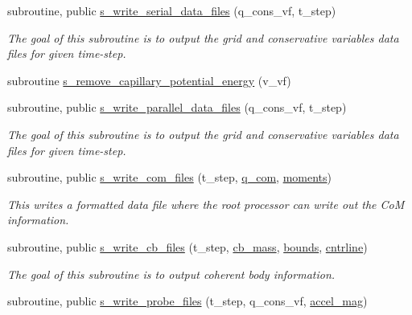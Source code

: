 \begin{DoxyCompactItemize}
subroutine, public \hyperlink{namespacem__data__output_a04c6b0f01b8561e248a740b017fc4f7d}{s\+\_\+write\+\_\+serial\+\_\+data\+\_\+files} (q\+\_\+cons\+\_\+vf, t\+\_\+step)
\begin{DoxyCompactList}\small\item\em The goal of this subroutine is to output the grid and conservative variables data files for given time-\/step. \end{DoxyCompactList}\item 
subroutine \hyperlink{namespacem__data__output_a178b41597f79f2c0a42c0d6e65275b71}{s\+\_\+remove\+\_\+capillary\+\_\+potential\+\_\+energy} (v\+\_\+vf)
\item 
subroutine, public \hyperlink{namespacem__data__output_a9c1271b2c588c1ae3275791d41550f75}{s\+\_\+write\+\_\+parallel\+\_\+data\+\_\+files} (q\+\_\+cons\+\_\+vf, t\+\_\+step)
\begin{DoxyCompactList}\small\item\em The goal of this subroutine is to output the grid and conservative variables data files for given time-\/step. \end{DoxyCompactList}\item 
subroutine, public \hyperlink{namespacem__data__output_a6be3381410dd028014de2c1d02b05139}{s\+\_\+write\+\_\+com\+\_\+files} (t\+\_\+step, \hyperlink{namespacem__data__output_ac5b476661d64159fdcd7364715495f30}{q\+\_\+com}, \hyperlink{namespacem__data__output_abd8505e33c0dce0f0aba7e27ae53bef5}{moments})
\begin{DoxyCompactList}\small\item\em This writes a formatted data file where the root processor can write out the CoM information. \end{DoxyCompactList}\item 
subroutine, public \hyperlink{namespacem__data__output_a40724c992117a24479573d9fbcdfa21b}{s\+\_\+write\+\_\+cb\+\_\+files} (t\+\_\+step, \hyperlink{namespacem__data__output_a775b8128a9261b4d095f9132508d309f}{cb\+\_\+mass}, \hyperlink{namespacem__data__output_a1e7a93a0d32bbc7c691381689771b6f9}{bounds}, \hyperlink{namespacem__data__output_a4f2a6c0ed44fb82d337013e700479ce5}{cntrline})
\begin{DoxyCompactList}\small\item\em The goal of this subroutine is to output coherent body information. \end{DoxyCompactList}\item 
subroutine, public \hyperlink{namespacem__data__output_a29f34883bc8e9d895dbb4232493397a1}{s\+\_\+write\+\_\+probe\+\_\+files} (t\+\_\+step, q\+\_\+cons\+\_\+vf, \hyperlink{namespacem__data__output_a1ccababc9891f8a719df1c52b49e969a}{accel\+\_\+mag})

\end{DoxyCompactItemize}
